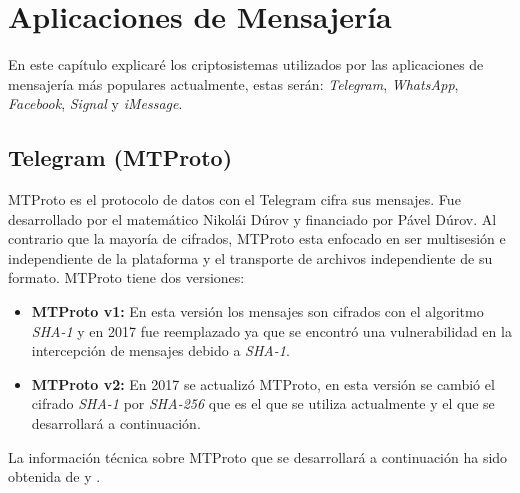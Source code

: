 \chapter{Aplicaciones de Mensajería}

En este capítulo explicaré los criptosistemas utilizados por las aplicaciones de mensajería más populares actualmente, estas serán: \emph{Telegram}, \emph{WhatsApp}, \emph{Facebook}, \emph{Signal} y \emph{iMessage}.

\section{Telegram (MTProto)}
MTProto es el protocolo de datos con el Telegram cifra sus mensajes. Fue desarrollado por el matemático Nikolái Dúrov y financiado por Pável Dúrov. Al contrario que la mayoría de cifrados, MTProto esta enfocado en ser multisesión e independiente de la plataforma y el transporte de archivos independiente de su formato. MTProto tiene dos versiones:
\begin{itemize}
	\item \textbf{MTProto v1:} En esta versión los mensajes son cifrados con el algoritmo \emph{SHA-1} y en 2017 fue reemplazado ya que se encontró una vulnerabilidad en la intercepción de mensajes debido a \emph{SHA-1}.
	\item \textbf{MTProto v2:} En 2017 se actualizó MTProto, en esta versión se cambió el cifrado \emph{SHA-1} por \emph{SHA-256} que es el que se utiliza actualmente y el que se desarrollará a continuación.
\end{itemize}
La información técnica sobre MTProto que se desarrollará a continuación ha sido obtenida de \cite{Miculan2021} y \cite{WebProto}.


